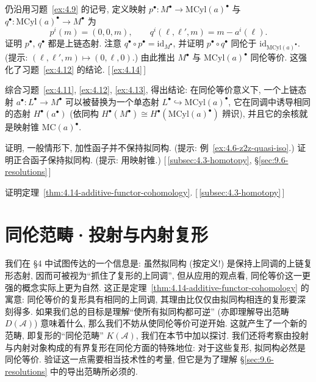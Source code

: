 \begin{prob}\label{ex:4.13}
仍沿用习题~\ref{ex:4.9} 的记号, 定义映射 $p^\bullet:M^\bullet\to\mathrm{MCyl}(a)^\bullet$ 与 $q^\bullet:\mathrm{MCyl}(a)^\bullet\to M^\bullet$ 为
\[
p^i(m)=(0,0,m),\qquad q^i(\ell,\ell',m)=m-a^i(\ell).
\]
证明 $p^\bullet$, $q^\bullet$ 都是上链态射. 注意 $q^\bullet\circ p^\bullet=\mathrm{id}_{M^\bullet}$, 并证明 $p^\bullet\circ q^\bullet$ 同伦于 $\mathrm{id}_{\mathrm{MCyl}(a)^\bullet}$. (提示: $(\ell,\ell',m)\mapsto(0,\ell,0)$.)
\indent 由此推出 $M^\bullet$ 与 $\mathrm{MCyl}(a)^\bullet$ 同伦等价. 这强化了习题~\ref{ex:4.12} 的结论. [\,\ref{ex:4.14}\,]
\end{prob}

\begin{prob}\label{ex:4.14}
综合习题~\ref{ex:4.11}, \ref{ex:4.12}, \ref{ex:4.13}, 得出结论: 在同伦等价意义下, 一个上链态射 $a^\bullet:L^\bullet\to M^\bullet$ 可以被替换为一个单态射 $L^\bullet\hookrightarrow\mathrm{MCyl}(a)^\bullet$, 它在同调中诱导相同的态射 $H^\bullet(a^\bullet)$ (依同构 $H^\bullet(M^\bullet)\cong H^\bullet(\mathrm{MCyl}(a)^\bullet)$ 辨识), 并且它的余核就是映射锥 $\mathrm{MC}(a)^\bullet$.
\end{prob}

\begin{prob}\label{ex:4.15}
证明, 一般情形下, 加性函子并不保持拟同构. (提示: 例~\ref{ex:4.6-z2z-quasi-iso}.) 证明正合函子保持拟同构. (提示: 用映射锥.) [\,\ref{subsec:4.3-homotopy}, \S\ref{sec:9.6-resolutions}\,]
\end{prob}

\begin{prob}\label{ex:4.16}
证明定理~\ref{thm:4.14-additive-functor-cohomology}. [\,\ref{subsec:4.3-homotopy}\,]
\end{prob}

\section{同伦范畴·投射与内射复形}
\label{sec:homotopic-category}

我们在 §4 中试图传达的一个信息是: 虽然拟同构 (按定义!) 是保持上同调的上链复形态射, 因而可被视为``抓住了复形的上同调'', 但从应用的观点看, 同伦等价这一更强的概念实际上更为自然. 这正是定理~\ref{thm:4.14-additive-functor-cohomology} 的寓意: 同伦等价的复形具有相同的上同调, 其理由比仅仅由拟同构相连的复形要深刻得多. 如果我们总的目标是理解``使所有拟同构都可逆'' (亦即理解导出范畴 $D(\mathcal{A})$) 意味着什么, 那么我们不妨从使同伦等价可逆开始. 这就产生了一个新的范畴, 即复形的``同伦范畴'' $K(\mathcal{A})$, 我们在本节中加以探讨. 我们还将考察由投射与内射对象构成的有界复形在同伦方面的特殊地位: 对于这些复形, 拟同构必然是同伦等价. 验证这一点需要相当技术性的考量, 但它是为了理解 \S\ref{sec:9.6-resolutions} 中的导出范畴所必须的.

